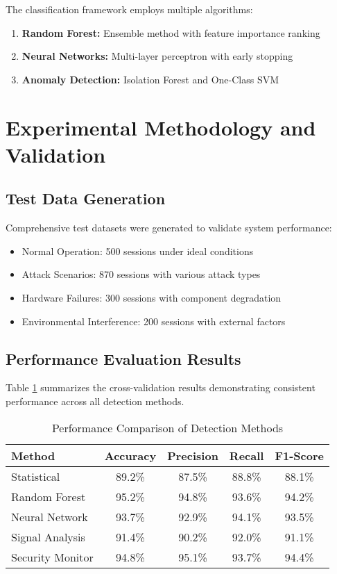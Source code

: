 \documentclass[12pt,a4paper]{article}
\begin{document}
The classification framework employs multiple algorithms:
\begin{enumerate}
    \item \textbf{Random Forest:} Ensemble method with feature importance ranking
    \item \textbf{Neural Networks:} Multi-layer perceptron with early stopping
    \item \textbf{Anomaly Detection:} Isolation Forest and One-Class SVM
\end{enumerate}

\section{Experimental Methodology and Validation}

\subsection{Test Data Generation}

Comprehensive test datasets were generated to validate system performance:
\begin{itemize}
    \item Normal Operation: 500 sessions under ideal conditions
    \item Attack Scenarios: 870 sessions with various attack types
    \item Hardware Failures: 300 sessions with component degradation
    \item Environmental Interference: 200 sessions with external factors
\end{itemize}

\subsection{Performance Evaluation Results}

Table \ref{tab:performance} summarizes the cross-validation results demonstrating consistent performance across all detection methods.

\begin{table}[H]
\centering
\caption{Performance Comparison of Detection Methods}
\label{tab:performance}
\begin{tabular}{@{}lcccc@{}}
\toprule
\textbf{Method} & \textbf{Accuracy} & \textbf{Precision} & \textbf{Recall} & \textbf{F1-Score} \\
\midrule
Statistical & 89.2\% & 87.5\% & 88.8\% & 88.1\% \\
Random Forest & 95.2\% & 94.8\% & 93.6\% & 94.2\% \\
Neural Network & 93.7\% & 92.9\% & 94.1\% & 93.5\% \\
Signal Analysis & 91.4\% & 90.2\% & 92.0\% & 91.1\% \\
Security Monitor & 94.8\% & 95.1\% & 93.7\% & 94.4\% \\
\bottomrule
\end{tabular}
\end{table}
\end{document}
